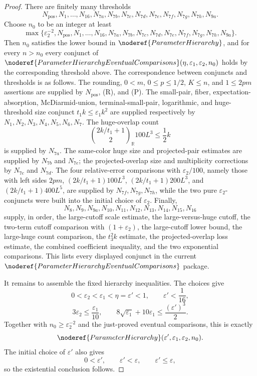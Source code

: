 \begin{proof}
There are finitely many thresholds
\[
N_{\mathrm{pos}},N_1,\ldots,N_{16},
N_{7a},N_{7b},N_{7c},N_{7d},N_{7e},N_{7f},N_{7g},N_{7h},N_{9a}.
\]
Choose \(n_0\) to be an integer at least
\[
\max\{\varepsilon_2^{-2},N_{\mathrm{pos}},N_1,\ldots,N_{16},
N_{7a},N_{7b},N_{7c},N_{7d},N_{7e},N_{7f},N_{7g},N_{7h},N_{9a}\}.
\]
Then \(n_0\) satisfies the lower bound in
\(\noderef{ParameterHierarchy}\), and for every \(n>n_0\) every conjunct of
\(\noderef{ParameterHierarchyEventualComparisons}(\eta,\varepsilon_1,
\varepsilon_2,n_0)\) holds by the corresponding threshold above.
The correspondence between conjuncts and thresholds is as follows.  The
rounding, \(0<m\), \(0\le p\le1/2\), \(K\le n\), and \(1\le2pm\) assertions
are supplied by \(N_{\mathrm{pos}}\), (R), and (P).  The small-pair, fiber,
expectation-absorption, McDiarmid-union, terminal-small-pair, logarithmic, and
huge-threshold size conjunct \(t_1k\le\varepsilon_1k^2\) are supplied
respectively by \(N_1,N_2,N_3,N_4,N_5,N_6,N_7\).  The huge-overlap count
\[
\binom{2k/t_1+1}{2}_{\mathbb R}100L^3\le\frac12k
\]
is supplied by \(N_{7a}\).  The same-color huge size and projected-pair
estimates are supplied by \(N_{7b}\) and \(N_{7e}\); the projected-overlap
size and multiplicity corrections by \(N_{7c}\) and \(N_{7d}\).  The four
relative-error comparisons with \(\varepsilon_2/100\), namely those with
left sides \(2pm\), \((2k/t_1+1)100L^3\), \((2k/t_1+1)200L^3\), and
\((2k/t_1+1)400L^5\), are supplied by \(N_{7f},N_{7g},N_{7h}\), while the two
pure \(\varepsilon_2\)-conjuncts were built into the initial choice of
\(\varepsilon_2\).  Finally,
\[
N_8,N_9,N_{9a},N_{10},N_{11},N_{12},N_{13},N_{14},N_{15},N_{16}
\]
supply, in order, the large-cutoff scale estimate, the large-versus-huge
cutoff, the two-term cutoff comparison with \((1+\varepsilon_2)\), the
large-cutoff lower bound, the large-huge count comparison, the \(t_3^2k\)
estimate, the projected-overlap loss estimate, the combined coefficient
inequality, and the two exponential comparisons.  This lists every displayed
conjunct in the current
\(\noderef{ParameterHierarchyEventualComparisons}\) package.

It remains to assemble the fixed hierarchy inequalities.  The choices
give
\[
0<\varepsilon_2<\varepsilon_1<\eta=\varepsilon'<1,\qquad
\varepsilon'<\frac1{16},
\]
\[
3\varepsilon_2\le\frac{\varepsilon_1}{10},\qquad
8\sqrt{\varepsilon_1}+10\varepsilon_1\le\frac{(\varepsilon')^3}{2}.
\]
Together with \(n_0\ge\varepsilon_2^{-2}\) and the just-proved eventual
comparisons, this is exactly
\[
\noderef{ParameterHierarchy}(\varepsilon',\varepsilon_1,\varepsilon_2,n_0).
\]
The initial choice of \(\varepsilon'\) also gives
\[
0<\varepsilon',\qquad \varepsilon'<\varepsilon,\qquad \varepsilon'\le\varepsilon,
\]
so the existential conclusion follows.
\end{proof}

